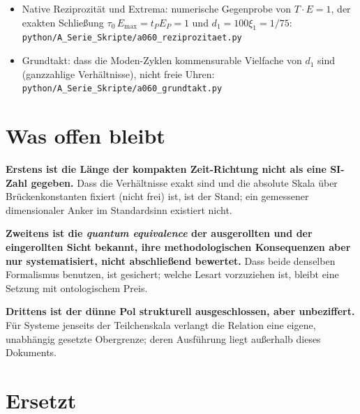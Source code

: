 \begin{itemize}[leftmargin=2em,itemsep=2pt,topsep=2pt]
  \item Native Reziprozität und Extrema: numerische Gegenprobe von
    $T\cdot E=1$, der exakten Schließung $\tau_0\,E_\text{max}=t_P E_P=1$ und
    $d_1=100\xi_1=1/75$:
    \texttt{python/A\_Serie\_Skripte/a060\_reziprozitaet.py}
  \item Grundtakt: dass die Moden-Zyklen kommensurable Vielfache von $d_1$ sind
    (ganzzahlige Verhältnisse), nicht freie Uhren:
    \texttt{python/A\_Serie\_Skripte/a060\_grundtakt.py}
\end{itemize}

\section{Was offen bleibt}

\textbf{Erstens ist die Länge der kompakten Zeit-Richtung nicht als eine SI-Zahl
gegeben.} Dass die Verhältnisse exakt sind und die absolute Skala über
Brückenkonstanten fixiert (nicht frei) ist, ist der Stand; ein gemessener
dimensionaler Anker im Standardsinn existiert nicht.

\textbf{Zweitens ist die \emph{quantum equivalence} der ausgerollten und der
eingerollten Sicht bekannt, ihre methodologischen Konsequenzen aber nur
systematisiert, nicht abschließend bewertet.} Dass beide denselben Formalismus
benutzen, ist gesichert; welche Lesart vorzuziehen ist, bleibt eine Setzung mit
ontologischem Preis.

\textbf{Drittens ist der dünne Pol strukturell ausgeschlossen, aber unbeziffert.}
Für Systeme jenseits der Teilchenskala verlangt die Relation eine eigene,
unabhängig gesetzte Obergrenze; deren Ausführung liegt außerhalb dieses Dokuments.

\section{Ersetzt}


